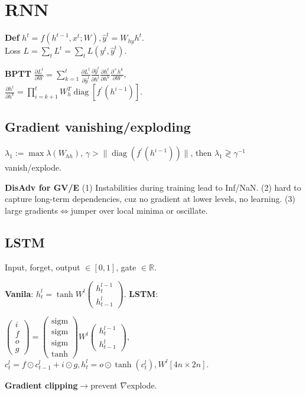 \section{RNN}
\textbf{Def} \(h^{t}=f(h^{t-1}, x^{t} ; W), \hat{y}^{t}=W_{h y} h^{t}\).\\ Loss \(L = \sum_t L^{t} =\sum_t L(y^{t}, \hat{y}^{t})\).

\textbf{BPTT} \(\frac{\partial L^{t}}{\partial W}=\sum_{k=1}^{t} \frac{\partial L^{t}}{\partial \hat{y}^{t}} \frac{\partial \hat{y}^{t}}{\partial h^{t}} \frac{\partial h^{t}}{\partial h^{k}} \frac{\partial^{+} h^{k}}{\partial W}\),\\
\(\frac{\partial h^{t}}{\partial h^{k}}=\prod_{i=k+1}^{t} W_{h}^{T} \operatorname{diag}[f^{\prime}(h^{i-1})]\).


\subsection*{Gradient vanishing/exploding}
\(\lambda_1 := \max \lambda(W_{hh})\), \(\gamma > \|\operatorname{diag}(f^{\prime}(h^{i-1}))\|\), then \(\lambda_1 \gtrless  \gamma^{-1}\) vanish/explode.

\textbf{DisAdv for GV/E} (1) Instabilities during training lead to Inf/NaN. (2) hard to capture long-term dependencies, cuz no gradient at lower levels, no learning. (3) large gradients\(\Leftrightarrow\)jumper over local minima or oscillate.

\subsection*{LSTM}
Input, forget, output \(\in [0, 1]\), gate \(\in\mathbb{R}\).

\textbf{Vanila}: \(h_{t}^{l}=\tanh W^{l}\left(\begin{array}{l}
    h_{t}^{l-1} \\
    h_{t-1}^{l}
    \end{array}\right)\).
\textbf{LSTM}:

\(\left(\begin{array}{l}
    i \\
    f \\
    o \\
    g
    \end{array}\right)=\left(\begin{array}{c}
    \operatorname{sigm} \\
    \operatorname{sigm} \\
    \operatorname{sigm} \\
    \tanh
    \end{array}\right) W^{l}\left(\begin{array}{l}
    h_{t}^{l-1} \\
    h_{t-1}^{l}
    \end{array}\right)\),
\(c_{t}^{l}=f \odot c_{t-1}^{l}+i \odot g, h_{t}^{l}=o \odot \tanh (c_{t}^{l}), W^{l}[4 n \times 2 n]\).
    
\textbf{Gradient clipping}\(\to\)prevent \(\nabla\)explode.

